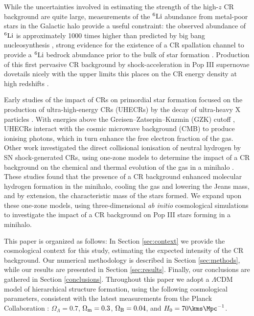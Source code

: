 While the uncertainties involved in estimating the strength of the high-$z$  CR background are quite large,  measurements of the $^6{\rm Li}$ abundance from metal-poor stars in the Galactic halo provide a useful constraint: the observed abundance of  $^6{\rm Li}$ is approximately 1000 times higher than predicted by big bang nucleosynthesis \citep{Asplundetal2006}, strong evidence for the existence of a CR spallation channel to provide a $^6{\rm Li}$ bedrock abundance prior to the bulk of star formation \citep{RollindeVangioniOlive2005,RollindeVangioniOlive2006}. 
Production of this first pervasive CR background by shock-acceleration in Pop III supernovae dovetails nicely with the upper limits this places on the CR energy density at high redshifts \citep{RollindeVangioniOlive2006}.

Early studies of the impact of CRs on primordial star formation focused on the production of ultra-high-energy CRs (UHECRs) by the decay of ultra-heavy X particles \citep{ShchekinovVasiliev2004,VasilievShchekinov2006,RipamontiMapelliFerrara2007}.  
With energies above the Greisen--Zatsepin--Kuzmin (GZK) cutoff \citep{Greisen1966,ZatsepinKuzmin1966}, UHECRs interact with the cosmic microwave background (CMB) to produce ionising photons, which in turn enhance the free electron fraction of the gas.  
Other work investigated the direct collisional ionisation of neutral hydrogen by SN shock-generated CRs, using one-zone models to determine the impact of a CR background on the chemical and thermal evolution of the gas in a minihalo \citep{StacyBromm2007,JascheCiardiEnsslin2007}.  
These studies found that the presence of a CR background enhanced molecular hydrogen formation in the minihalo, cooling the gas and lowering the Jeans mass, and by extension, the characteristic mass of the stars formed. 
We expand upon these one-zone models, using three-dimensional \textit{ab initio} cosmological simulations to investigate the impact of a CR background on Pop III stars forming in a minihalo.

This paper is organized as follows: In Section \ref{sec:context} we provide the cosmological context for this study, estimating the expected intensity of the CR background. Our numerical methodology is described in Section \ref{sec:methods}, while our results are presented in Section \ref{sec:results}.  
Finally, our conclusions are gathered in Section \ref{conclusions}. Throughout this paper we adopt a $\Lambda$CDM model of hierarchical structure formation, using the following cosmological parameters, consistent with the latest measurements from the Planck Collaboration \citep{PlanckParams2015}: $\Omega_{\Lambda} = 0.7$, $\Omega_{\rm m} = 0.3$, $\Omega_{\rm B} = 0.04$, and $H_0 = 70 \kms \Mpc^{-1}$.